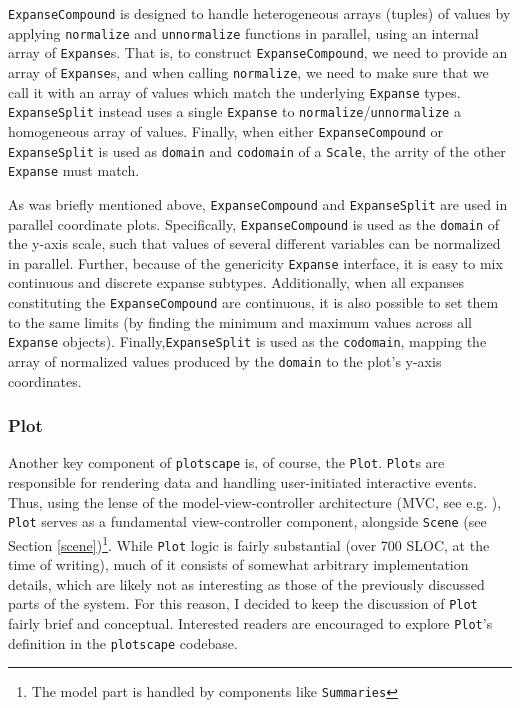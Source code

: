 \documentclass[
  openany]{book}
\theoremstyle{definition}
\theoremstyle{definition}
\theoremstyle{definition}
\theoremstyle{definition}
\theoremstyle{remark}
\begin{document}
\texttt{ExpanseCompound} is designed to handle heterogeneous arrays (tuples) of values by applying \texttt{normalize} and \texttt{unnormalize} functions in parallel, using an internal array of \texttt{Expanse}s. That is, to construct \texttt{ExpanseCompound}, we need to provide an array of \texttt{Expanse}s, and when calling \texttt{normalize}, we need to make sure that we call it with an array of values which match the underlying \texttt{Expanse} types. \texttt{ExpanseSplit} instead uses a single \texttt{Expanse} to \texttt{normalize}/\texttt{unnormalize} a homogeneous array of values. Finally, when either \texttt{ExpanseCompound} or \texttt{ExpanseSplit} is used as \texttt{domain} and \texttt{codomain} of a \texttt{Scale}, the arrity of the other \texttt{Expanse} must match.

As was briefly mentioned above, \texttt{ExpanseCompound} and \texttt{ExpanseSplit} are used in parallel coordinate plots. Specifically, \texttt{ExpanseCompound} is used as the \texttt{domain} of the y-axis scale, such that values of several different variables can be normalized in parallel. Further, because of the genericity \texttt{Expanse} interface, it is easy to mix continuous and discrete expanse subtypes. Additionally, when all expanses constituting the \texttt{ExpanseCompound} are continuous, it is also possible to set them to the same limits (by finding the minimum and maximum values across all \texttt{Expanse} objects). Finally,\texttt{ExpanseSplit} is used as the \texttt{codomain}, mapping the array of normalized values produced by the \texttt{domain} to the plot's y-axis coordinates.

\subsubsection{Plot}\label{plot}

Another key component of \texttt{plotscape} is, of course, the \texttt{Plot}. \texttt{Plot}s are responsible for rendering data and handling user-initiated interactive events. Thus, using the lense of the model-view-controller architecture (MVC, see e.g. ), \texttt{Plot} serves as a fundamental view-controller component, alongside \texttt{Scene} (see Section \ref{scene})\footnote{The model part is handled by components like \texttt{Summaries}}. While \texttt{Plot} logic is fairly substantial (over 700 SLOC, at the time of writing), much of it consists of somewhat arbitrary implementation details, which are likely not as interesting as those of the previously discussed parts of the system. For this reason, I decided to keep the discussion of \texttt{Plot} fairly brief and conceptual. Interested readers are encouraged to explore \texttt{Plot}'s definition in the \texttt{plotscape} codebase.
\end{document}
